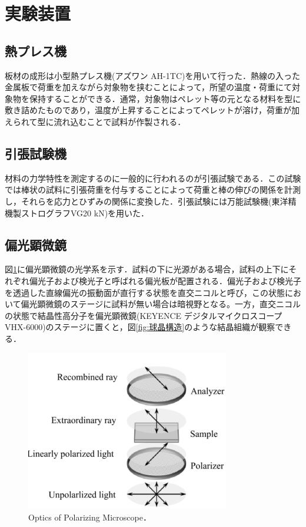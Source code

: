 \section{実験装置}

\subsection{熱プレス機}
板材の成形は小型熱プレス機(アズワン AH-1TC)を用いて行った．熱線の入った金属板で荷重を加えながら対象物を挟むことによって，所望の温度・荷重にて対象物を保持することができる．通常，対象物はペレット等の元となる材料を型に敷き詰めたものであり，温度が上昇することによってペレットが溶け，荷重が加えられて型に流れ込むことで試料が作製される．

\subsection{引張試験機}
材料の力学特性を測定するのに一般的に行われるのが引張試験である．この試験では棒状の試料に引張荷重を付与することによって荷重と棒の伸びの関係を計測し，それらを応力とひずみの関係に変換した．引張試験には万能試験機(東洋精機製ストログラフVG20 kN)を用いた．

\subsection{偏光顕微鏡}
図\ref{fig:光学系}に偏光顕微鏡の光学系を示す．試料の下に光源がある場合，試料の上下にそれぞれ偏光子および検光子と呼ばれる偏光板が配置される．偏光子および検光子を透過した直線偏光の振動面が直行する状態を直交ニコルと呼び，この状態において偏光顕微鏡のステージに試料が無い場合は暗視野となる。一方，直交ニコルの状態で結晶性高分子を偏光顕微鏡(KEYENCE デジタルマイクロスコープVHX-6000)のステージに置くと，図\ref{fig:球晶構造}のような結晶組織が観察できる．

\begin{figure}[htbp]
    \centering %
    \includegraphics[width=100truemm,clip]{fig/fig_光学系.png}
    \caption{Optics of Polarizing Microscope．}
    \label{fig:光学系}
\end{figure}